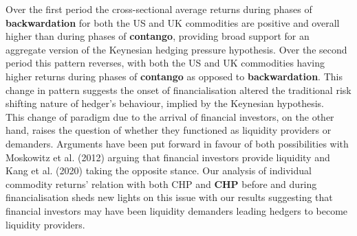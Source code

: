 \documentclass[]{elsarticle} %
\begin{document}
\medskip\setlength{\parindent}{0pt}

Over the first period the cross-sectional average returns during phases of \textbf{backwardation} for both the US and UK commodities are positive and overall higher than during phases of \textbf{contango}, providing broad support for an aggregate version of the Keynesian hedging pressure hypothesis. Over the second period this pattern reverses, with both the US and UK commodities having higher returns during phases of \textbf{contango} as opposed to \textbf{backwardation}. This change in pattern suggests the onset of financialisation altered the traditional risk shifting nature of hedger's behaviour, implied by the Keynesian hypothesis.\\
This change of paradigm due to the arrival of financial investors, on the other hand, raises the question of whether they functioned as liquidity providers or demanders. Arguments have been put forward in favour of both possibilities with Moskowitz et al. (2012) arguing that financial investors provide liquidity and Kang et al. (2020) taking the opposite stance. Our analysis of individual commodity returns' relation with both CHP and \textbf{CHP} before and during financialisation sheds new lights on this issue with our results suggesting that financial investors may have been liquidity demanders leading hedgers to become liquidity providers.

\medskip\setlength{\parindent}{0pt}
\end{document}
